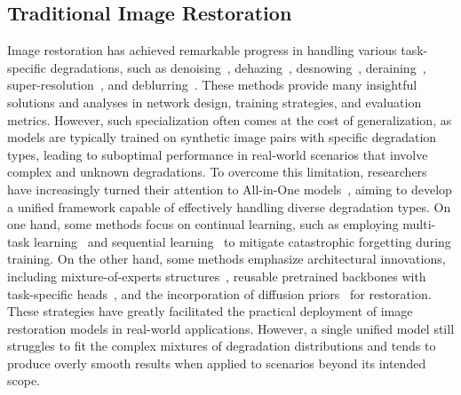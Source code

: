 \subsection{Traditional Image Restoration}
Image restoration has achieved remarkable progress in handling various task-specific degradations, such as denoising~\cite{zhang2023practical,chen2023masked}, dehazing~\cite{wu2023ridcp,jin2022structure,lin2024nighthaze}, desnowing~\cite{chen2021all,cheng2023snow,Chen_2023_ICCV}, deraining~\cite{xiao2022image,chen2023learning,chen2023sparse}, super-resolution~\cite{dong2015image,wang2021real,chen2024low,wang2024exploiting,sun2024coser}, and deblurring~\cite{tsai2022stripformer,chen2023hierarchical}.
These methods provide many insightful solutions and analyses in network design, training strategies, and evaluation metrics.
However, such specialization often comes at the cost of generalization, as models are typically trained on synthetic image pairs with specific degradation types, leading to suboptimal performance in real-world scenarios that involve complex and unknown degradations.
To overcome this limitation, researchers have increasingly turned their attention to All-in-One models~\cite{surveygenir}, aiming to develop a unified framework capable of effectively handling diverse degradation types.
On one hand, some methods focus on continual learning, such as employing multi-task learning~\cite{wu2024harmony,zhang2023ingredient} and sequential learning~\cite{kong2024towards} to mitigate catastrophic forgetting during training.
On the other hand, some methods emphasize architectural innovations, including mixture-of-experts structures~\cite{yu2024multi}, reusable pretrained backbones with task-specific heads~\cite{chen2020pre}, and the incorporation of diffusion priors~\cite{kong2025dual} for restoration. 
These strategies have greatly facilitated the practical deployment of image restoration models in real-world applications.
However, a single unified model still struggles to fit the complex mixtures of degradation distributions and tends to produce overly smooth results when applied to scenarios beyond its intended scope.

